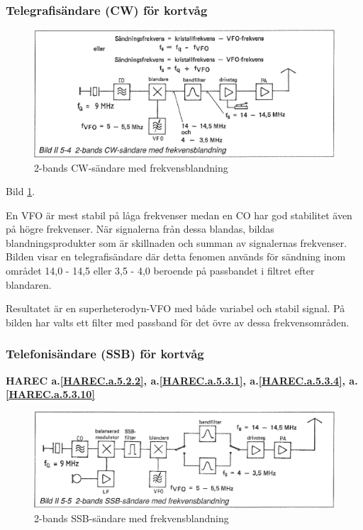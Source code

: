 \subsubsection{Telegrafisändare (CW) för kortvåg}

\begin{figure}
  \includegraphics[width=\textwidth]{images/bild_2_5-04}
  \caption{2-bands CW-sändare med frekvensblandning}
  \label{fig:bildII5-4}
\end{figure}

Bild \ref{fig:bildII5-4}.

En VFO är mest stabil på låga frekvenser medan en CO har god
stabilitet även på högre frekvenser. När signalerna från dessa
blandas, bildas blandningsprodukter som är skillnaden och summan av
signalernas frekvenser. Bilden visar en telegrafisändare där detta
fenomen används för sändning inom området 14,0 - 14,5 eller 3,5 - 4,0
beroende på passbandet i filtret efter blandaren.

Resultatet är en superheterodyn-VFO med både variabel och stabil
signal. På bilden har valts ett filter med passband för det övre av
dessa frekvensområden.

\subsubsection{Telefonisändare (SSB) för kortvåg}
\textbf{
HAREC a.\ref{HAREC.a.5.2.2}\label{myHAREC.a.5.2.2},
 a.\ref{HAREC.a.5.3.1}\label{myHAREC.a.5.3.1},
 a.\ref{HAREC.a.5.3.4}\label{myHAREC.a.5.3.4},
 a.\ref{HAREC.a.5.3.10}\label{myHAREC.a.5.3.10}
}

\begin{figure}
  \includegraphics[width=\textwidth]{images/bild_2_5-05}
  \caption{2-bands SSB-sändare med frekvensblandning}
  \label{fig:bildII5-5}
\end{figure}

